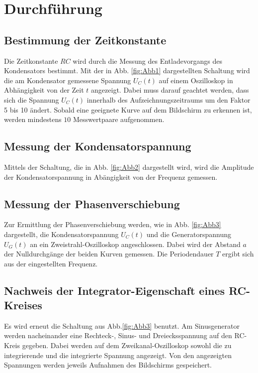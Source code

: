 \section{Durchführung}
\label{sec:Durchführung}

\subsection{Bestimmung der Zeitkonstante}
Die Zeitkonstante $RC$ wird durch die Messung des Entladevorgangs des Kondensators bestimmt. 
Mit der in Abb. \ref{fig:Abb1} dargestellten Schaltung wird die am Kondensator gemessene Spannung $U_{C}(t)$ auf einem
Oszilloskop in Abhängigkeit von der Zeit $t$ angezeigt. Dabei muss darauf geachtet werden, dass sich die Spannung 
$U_{C}(t)$ innerhalb des Aufzeichnungszeitraums um den Faktor 5 bis 10 ändert. Sobald eine geeignete Kurve auf dem 
Bildschirm zu erkennen ist, werden mindestens $10$ Messwertpaare aufgenommen.

\subsection{Messung der Kondensatorspannung}
Mittels der Schaltung, die in Abb. \ref{fig:Abb2} dargestellt wird, wird die Amplitude der Kondensatorspannung in 
Abängigkeit von der Frequenz gemessen.

\subsection{Messung der Phasenverschiebung}
Zur Ermittlung der Phasenverschiebung werden, wie in Abb. \ref{fig:Abb3} dargestellt, die Kondensatorspannung $U_{C}(t)$ 
und die Generatorspannung $U_{G}(t)$ an ein Zweistrahl-Oszilloskop angeschlossen. Dabei wird der Abstand $a$ der 
Nulldurchgänge der beiden Kurven gemessen. Die Periodendauer $T$ ergibt sich aus der eingestellten Frequenz.%

\subsection{Nachweis der Integrator-Eigenschaft eines RC-Kreises}
Es wird erneut die Schaltung aus Abb.\ref{fig:Abb3} benutzt. Am Sinusgenerator werden nacheinander eine Rechteck-, 
Sinus- und Dreiecksspannung auf den RC-Kreis gegeben. Dabei werden auf dem Zweikanal-Oszilloskop sowohl die 
zu integrierende und die integrierte Spannung angezeigt. Von den angezeigten Spannungen werden jeweils Aufnahmen
des Bildschirms gespeichert. 
